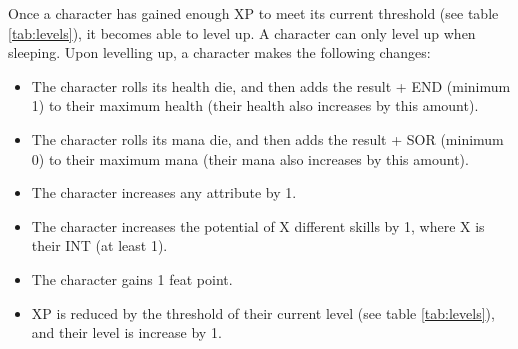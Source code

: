 \begin{multicols}{2}
    Once a character has gained enough XP to meet its current threshold (see table
    \ref{tab:levels}), it becomes able to level up. A character can only level
    up when sleeping. Upon levelling up, a character makes the following changes:
    \begin{itemize}
        \item The character rolls its health die, and then adds the result +
            END (minimum 1) to their maximum health (their health also increases by this
            amount).
        \item The character rolls its mana die, and then adds the result + SOR
            (minimum 0) to their maximum mana (their mana also increases by
            this amount).
        \item The character increases any attribute by 1.
        \item The character increases the potential of X different skills by 1,
            where X is their INT (at least 1).
        \item The character gains 1 feat point.
        \item XP is reduced by the threshold of their current level (see table
            \ref{tab:levels}), and their level is increase by 1.
    \end{itemize}
\end{multicols}
